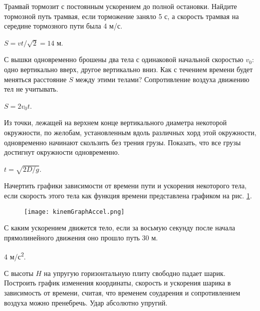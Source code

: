 \begin{ex} %
Трамвай тормозит с постоянным ускорением до полной остановки. Найдите тормозной путь трамвая, если торможение заняло 5 с, а скорость трамвая на середине тормозного пути была 4 м/с.
\begin{ans}
$S = vt/\sqrt{2} = 14$ м.
\end{ans}
\end{ex}

\begin{ex} %
С вышки одновременно брошены два тела с одинаковой начальной скоростью $v_0$: одно вертикально вверх, другое вертикально вниз. Как с течением времени будет меняться расстояние $S$ между этими телами? Сопротивление воздуха движению тел не учитывать.
\begin{ans}
$S = 2 v_0 t$.
\end{ans}
\end{ex}

\begin{ex} %
Из точки, лежащей на верхнем конце вертикального диаметра некоторой окружности, по желобам, установленным вдоль различных хорд этой окружности, одновременно начинают скользить без трения грузы. Показать, что все грузы достигнут окружности одновременно.
\begin{ans}
$t = \sqrt{2D/g}$.
\end{ans}
\end{ex}

\begin{ex} %
Начертить графики зависимости от времени пути и ускорения некоторого тела, если скорость этого тела как функция времени представлена графиком на рис. \ref{kinemGraphAccel}.

\begin{figure}
\centering
\texttt{[image: kinemGraphAccel.png]}
\caption{}
\label{kinemGraphAccel}
\end{figure}
\begin{ans}
\end{ans}
\end{ex}

\begin{ex} %
С каким ускорением движется тело, если за восьмую секунду после начала прямолинейного движения оно прошло путь 30 м.
\begin{ans}
4 м/с\textsuperscript{2}.
\end{ans}
\end{ex}


\begin{ex} %
С высоты $H$ на упругую горизонтальную плиту свободно падает шарик. Построить график изменения координаты, скорость и ускорения шарика в зависимость от времени, считая, что временем соударения и сопротивлением воздуха можно пренебречь. Удар абсолютно упругий.
\begin{ans}
\end{ans}
\end{ex}


